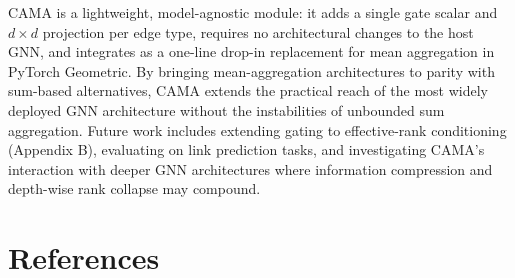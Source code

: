 \documentclass[final]{article}
\begin{document}
CAMA is a lightweight, model-agnostic module: it adds a single gate scalar and $d \times d$ projection per edge type, requires no architectural changes to the host GNN, and integrates as a one-line drop-in replacement for mean aggregation in PyTorch Geometric. By bringing mean-aggregation architectures to parity with sum-based alternatives, CAMA extends the practical reach of the most widely deployed GNN architecture without the instabilities of unbounded sum aggregation. Future work includes extending gating to effective-rank conditioning (Appendix B), evaluating on link prediction tasks, and investigating CAMA's interaction with deeper GNN architectures where information compression and depth-wise rank collapse may compound.


\section{References}
\end{document}
